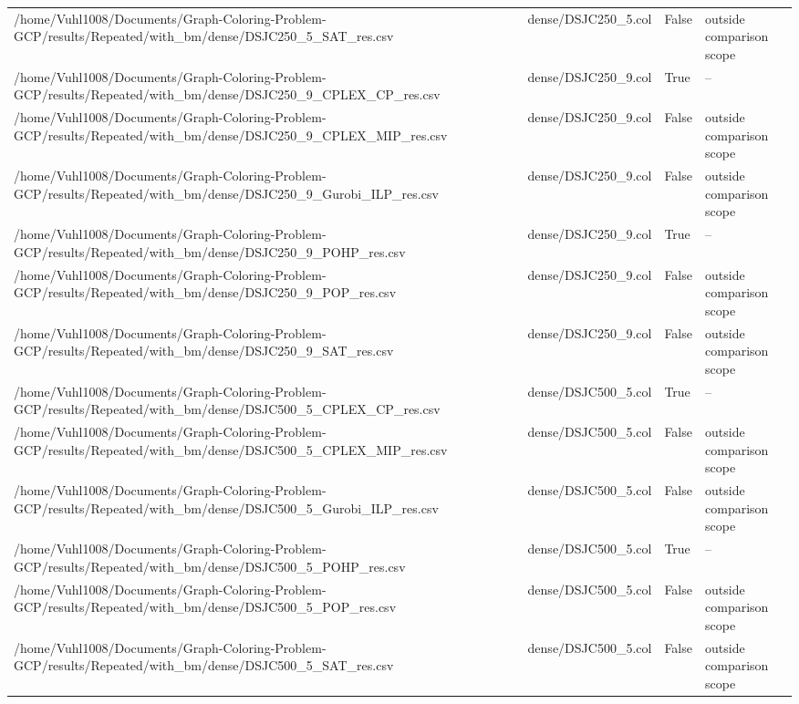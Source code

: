 \begin{table}[htbp]
\begin{tabular}{llll}
/home/Vuhl1008/Documents/Graph-Coloring-Problem-GCP/results/Repeated/with\_bm/dense/DSJC250\_5\_SAT\_res.csv & dense/DSJC250\_5.col & False & outside comparison scope \\
/home/Vuhl1008/Documents/Graph-Coloring-Problem-GCP/results/Repeated/with\_bm/dense/DSJC250\_9\_CPLEX\_CP\_res.csv & dense/DSJC250\_9.col & True & -- \\
/home/Vuhl1008/Documents/Graph-Coloring-Problem-GCP/results/Repeated/with\_bm/dense/DSJC250\_9\_CPLEX\_MIP\_res.csv & dense/DSJC250\_9.col & False & outside comparison scope \\
/home/Vuhl1008/Documents/Graph-Coloring-Problem-GCP/results/Repeated/with\_bm/dense/DSJC250\_9\_Gurobi\_ILP\_res.csv & dense/DSJC250\_9.col & False & outside comparison scope \\
/home/Vuhl1008/Documents/Graph-Coloring-Problem-GCP/results/Repeated/with\_bm/dense/DSJC250\_9\_POHP\_res.csv & dense/DSJC250\_9.col & True & -- \\
/home/Vuhl1008/Documents/Graph-Coloring-Problem-GCP/results/Repeated/with\_bm/dense/DSJC250\_9\_POP\_res.csv & dense/DSJC250\_9.col & False & outside comparison scope \\
/home/Vuhl1008/Documents/Graph-Coloring-Problem-GCP/results/Repeated/with\_bm/dense/DSJC250\_9\_SAT\_res.csv & dense/DSJC250\_9.col & False & outside comparison scope \\
/home/Vuhl1008/Documents/Graph-Coloring-Problem-GCP/results/Repeated/with\_bm/dense/DSJC500\_5\_CPLEX\_CP\_res.csv & dense/DSJC500\_5.col & True & -- \\
/home/Vuhl1008/Documents/Graph-Coloring-Problem-GCP/results/Repeated/with\_bm/dense/DSJC500\_5\_CPLEX\_MIP\_res.csv & dense/DSJC500\_5.col & False & outside comparison scope \\
/home/Vuhl1008/Documents/Graph-Coloring-Problem-GCP/results/Repeated/with\_bm/dense/DSJC500\_5\_Gurobi\_ILP\_res.csv & dense/DSJC500\_5.col & False & outside comparison scope \\
/home/Vuhl1008/Documents/Graph-Coloring-Problem-GCP/results/Repeated/with\_bm/dense/DSJC500\_5\_POHP\_res.csv & dense/DSJC500\_5.col & True & -- \\
/home/Vuhl1008/Documents/Graph-Coloring-Problem-GCP/results/Repeated/with\_bm/dense/DSJC500\_5\_POP\_res.csv & dense/DSJC500\_5.col & False & outside comparison scope \\
/home/Vuhl1008/Documents/Graph-Coloring-Problem-GCP/results/Repeated/with\_bm/dense/DSJC500\_5\_SAT\_res.csv & dense/DSJC500\_5.col & False & outside comparison scope \\

\end{tabular}
\end{table}

